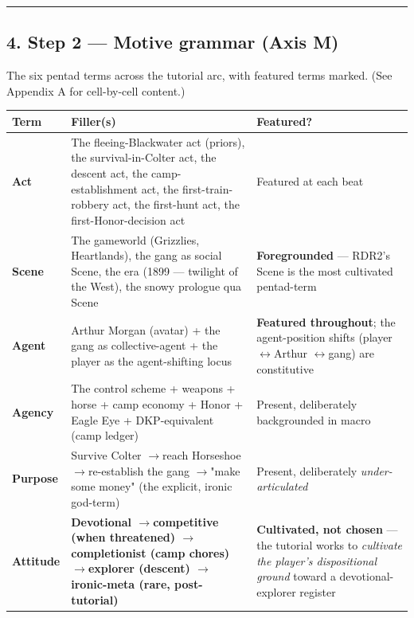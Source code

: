 \documentclass[11pt]{report}
\begin{document}
\vspace{0.4em}\hrule\vspace{0.8em}


\subsection{4. Step 2 — Motive grammar (Axis M)}


The six pentad terms across the tutorial arc, with featured terms marked. (See Appendix A for cell-by-cell content.)


\begin{table}[H]
\renewcommand{\arraystretch}{1.25}
\begin{tabularx}{\textwidth}{>{\RaggedRight\arraybackslash}X>{\RaggedRight\arraybackslash}X>{\RaggedRight\arraybackslash}X}
\toprule
Term & Filler(s) & Featured? \\
\midrule
\textbf{Act} & The fleeing-Blackwater act (priors), the survival-in-Colter act, the descent act, the camp-establishment act, the first-train-robbery act, the first-hunt act, the first-Honor-decision act & Featured at each beat \\
\textbf{Scene} & The gameworld (Grizzlies, Heartlands), the gang as social Scene, the era (1899 — twilight of the West), the snowy prologue qua Scene & \textbf{Foregrounded} — RDR2's Scene is the most cultivated pentad-term \\
\textbf{Agent} & Arthur Morgan (avatar) + the gang as collective-agent + the player as the agent-shifting locus & \textbf{Featured throughout}; the agent-position shifts (player $\leftrightarrow$\allowbreak  Arthur $\leftrightarrow$\allowbreak  gang) are constitutive \\
\textbf{Agency} & The control scheme + weapons + horse + camp economy + Honor + Eagle Eye + DKP-equivalent (camp ledger) & Present, deliberately backgrounded in macro \\
\textbf{Purpose} & Survive Colter $\rightarrow$\allowbreak  reach Horseshoe $\rightarrow$\allowbreak  re-establish the gang $\rightarrow$\allowbreak  "make some money" (the explicit, ironic god-term) & Present, deliberately \textit{under-articulated} \\
\textbf{Attitude} & \textbf{Devotional $\rightarrow$\allowbreak  competitive (when threatened) $\rightarrow$\allowbreak  completionist (camp chores) $\rightarrow$\allowbreak  explorer (descent) $\rightarrow$\allowbreak  ironic-meta (rare, post-tutorial)} & \textbf{Cultivated, not chosen} — the tutorial works to \textit{cultivate the player's dispositional ground} toward a devotional-explorer register \\
\bottomrule
\end{tabularx}
\end{table}
\end{document}
